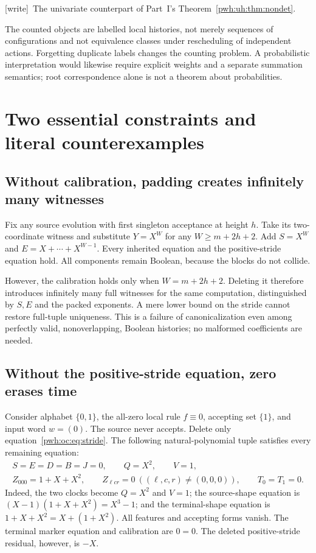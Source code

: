 \documentclass[11pt,letterpaper]{article}
\numberwithin{equation}{section}
\theoremstyle{definition}
\newcommand{\wtag}{\textup{[write]}}
\begin{document}
\wtag\ The univariate counterpart of Part~I's
Theorem~\ref{pwh:uh:thm:nondet}.

The counted objects are labelled local histories, not merely sequences
of configurations and not equivalence classes under rescheduling of
independent actions. Forgetting duplicate labels changes the counting
problem. A probabilistic interpretation would likewise require explicit
weights and a separate summation semantics; root correspondence alone
is not a theorem about probabilities.

\section{Two essential constraints and literal counterexamples}
\label{pwh:oc:sec:counterexamples}

\subsection{Without calibration, padding creates infinitely many witnesses}

Fix any source evolution with first singleton acceptance at height $h$.
Take its two-coordinate witness and substitute $Y=X^W$ for any
$W\ge m+2h+2$. Add $S=X^W$ and $E=X+\cdots+X^{W-1}$.
Every inherited equation and the positive-stride equation hold. All
components remain Boolean, because the blocks do not collide.

However, the calibration holds only when $W=m+2h+2$. Deleting it
therefore introduces infinitely many full witnesses for the same
computation, distinguished by $S,E$ and the packed exponents.
A mere lower bound on the stride cannot restore full-tuple uniqueness.
This is a failure of canonicalization even among perfectly valid,
nonoverlapping, Boolean histories; no malformed coefficients are needed.

\subsection{Without the positive-stride equation, zero erases time}

Consider alphabet $\{0,1\}$, the all-zero local rule $f\equiv0$,
accepting set $\{1\}$, and input word $w=(0)$. The source never accepts.
Delete only equation~\eqref{pwh:oc:eq:stride}. The following natural-polynomial
tuple satisfies every remaining equation:
\begin{equation}
 \begin{gathered}
 S=E=D=B=J=0,\qquad Q=X^2,\qquad V=1,\\
 Z_{000}=1+X+X^2,\qquad Z_{\ell cr}=0\ ((\ell,c,r)\ne(0,0,0)),
 \qquad T_0=T_1=0.
 \end{gathered}
 \label{pwh:oc:eq:ghost}
\end{equation}
Indeed, the two clocks become $Q=X^2$ and $V=1$; the source-shape equation
is $(X-1)(1+X+X^2)=X^3-1$; and the terminal-shape equation is
$1+X+X^2=X+(1+X^2)$. All features and accepting forms vanish.
The terminal marker equation and calibration are $0=0$.
The deleted positive-stride residual, however, is $-X$.
\end{document}
